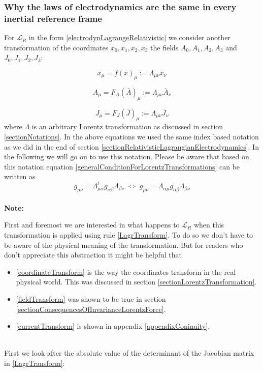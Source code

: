 \documentclass{article}
\begin{document}
\subsubsection{Why the laws of electrodynamics are the same in every inertial reference frame}

For $\mathcal{L}_R$ in the form \ref{electrodynLagrangeRelativistic} we consider another transformation of the coordinates $x_0, x_1, x_2, x_3$ the fields $A_0,A_1,A_2,A_3$ and $J_0,J_1,J_2,J_3$:

\begin{equation} \label{coordinateTransform}
    x_\mu = f(\bar{x})_\mu := \Lambda_{\mu\nu} \bar{x}_\nu
\end{equation}

\begin{equation} \label{fieldTransform}
    A_\mu = F_A(\bar{A})_\mu := \Lambda_{\mu\nu} \bar{A}_\nu
\end{equation}

\begin{equation} \label{currentTransform}
    J_\mu = F_J(\bar{J})_\mu := \Lambda_{\mu\nu} \bar{J}_\nu
\end{equation}
where $\Lambda$ is an arbitrary Lorentz transformation as discussed in section \ref{sectionNotations}.
In the above equations we used the same index based notation as we did in the end of section \ref{sectionRelativisticLagrangianElectrodynamics}.
In the following we will go on to use this notation.
Please be aware that based on this notation equation \ref{generalConditionForLorentzTransformations} can be written as
\begin{equation} \label{invarianceWithMetricTensor}
    g_{\mu\nu} = \Lambda^t_{\mu\alpha} g_{\alpha\beta} \Lambda_{\beta\nu}
    \; \iff \; g_{\mu\nu} = \Lambda_{\alpha\mu} g_{\alpha\beta} \Lambda_{\beta\nu}
\end{equation}
\\
\noindent
\textbf{Note:}

\noindent
First and foremost we are  interested in what happens to $\mathcal{L}_R$ when this transformation is applied using rule \ref{LagrTransform}.
To do so we don't have to be aware of the physical meaning of the transformation.
But for readers who don't appreciate this abstraction it might be helpful that
\begin{itemize}
    \item \ref{coordinateTransform} is the way the coordinates transform in the real physical world.
    This was discussed in section \ref{sectionLorentzTransformation}.
    \item \ref{fieldTransform} was shown to be true in section \ref{sectionConsequencesOfInvarianceLorentzForce}.
    \item \ref{currentTransform} is shown in appendix \ref{appendixConinuity}.
\end{itemize}
\\
\noindent
First we look after the absolute value of the determinant of the Jacobian matrix in \ref{LagrTransform}:
\end{document}
